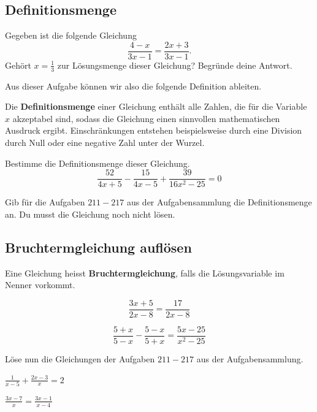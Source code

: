 \documentclass[11pt,oneside]{article}
\begin{document}
\subsection{Definitionsmenge}
	\vspace{5pt}
	\begin{aufgabe}
		Gegeben ist die folgende Gleichung \[\frac{4-x}{3x-1}=\frac{2x+3}{3x-1}.\] Gehört $x=\frac{1}{3}$ zur Lösungsmenge dieser Gleichung? Begründe deine Antwort.
	\end{aufgabe}
	Aus dieser Aufgabe können wir also die folgende Definition ableiten.
	\begin{definition}
		Die \textbf{Definitionsmenge} einer Gleichung enthält alle Zahlen, die für die Variable $x$ akzeptabel sind, sodass die Gleichung einen sinnvollen mathematischen Ausdruck ergibt.\vspace{5pt}\newline
		Einschränkungen entstehen beispielsweise durch eine Division durch Null oder eine negative Zahl unter der Wurzel.
	\end{definition}
	\begin{beispiel}
		Bestimme die Definitionsmenge dieser Gleichung. \[\frac{52}{4x+5}-\frac{15}{4x-5}+\frac{39}{16x^2-25}=0\]
		\vspace{5pt}\karos{7.5}
	\end{beispiel}
	\begin{aufgabe}
		Gib für die Aufgaben $211-217$ aus der Aufgabensammlung die Definitionsmenge an. Du musst die Gleichung noch nicht lösen.
	\end{aufgabe}
	\newpage
\subsection{Bruchtermgleichung auflösen}
	\vspace{5pt}
	\begin{definition}
		Eine Gleichung heisst \textbf{Bruchtermgleichung}, falls die Lösungsvariable im Nenner vorkommt.
	\end{definition}
	\begin{beispiel}
		\[\frac{3x+5}{2x-8}=\frac{17}{2x-8}\]\karos{5.5}
	\end{beispiel}
	\begin{beispiel}
		\[\frac{5+x}{5-x}-\frac{5-x}{5+x}=\frac{5x-25}{x^2-25}\]
	\end{beispiel}
	\begin{aufgabe}
		Löse nun die Gleichungen der Aufgaben $211-217$ aus der Aufgabensammlung.
		\begin{enumcols}[2]
			\item $\displaystyle\frac{1}{x-5}+\frac{2x-3}{x}=2$
			\item $\displaystyle\frac{3x-7}{x}=\frac{3x-1}{x-4}$
		\end{enumcols}
	\end{aufgabe}
\newpage
\end{document}

